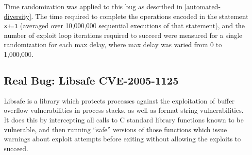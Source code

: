 Time randomization was applied to this bug as described in \autoref{automated-diversity}.
The time required to complete the operations encoded in the statement \texttt{x+=1} (averaged over 10,000,000 sequential executions of that statement), and the number of exploit loop iterations required to succeed were measured for a single randomization for each max delay, where max delay was varied from 0 to 1,000,000.
\subsection{Real Bug: Libsafe CVE-2005-1125}
Libsafe \cite{Tsai2001} is a library which protects processes against the
exploitation of buffer overflow vulnerabilities in process stacks, as well as
format string vulnerabilities.  It does this by intercepting all calls to C
standard library functions known to be vulnerable, and then running ``safe'' versions of those functions which issue warnings about exploit attempts before exiting without allowing the exploits to succeed.

